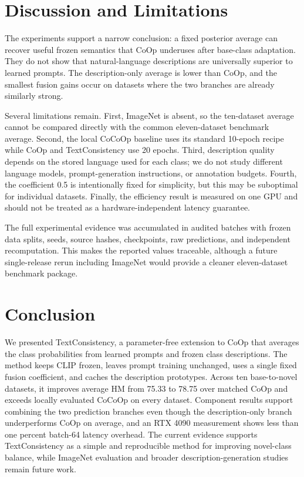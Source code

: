 \documentclass[preprint,12pt]{elsarticle}
\begin{document}
\section{Discussion and Limitations}
\label{sec:limitations}

The experiments support a narrow conclusion: a fixed posterior average can recover useful frozen semantics that CoOp underuses after base-class adaptation. They do not show that natural-language descriptions are universally superior to learned prompts. The description-only average is lower than CoOp, and the smallest fusion gains occur on datasets where the two branches are already similarly strong.

Several limitations remain. First, ImageNet is absent, so the ten-dataset average cannot be compared directly with the common eleven-dataset benchmark average. Second, the local CoCoOp baseline uses its standard 10-epoch recipe while CoOp and TextConsistency use 20 epochs. Third, description quality depends on the stored language used for each class; we do not study different language models, prompt-generation instructions, or annotation budgets. Fourth, the coefficient 0.5 is intentionally fixed for simplicity, but this may be suboptimal for individual datasets. Finally, the efficiency result is measured on one GPU and should not be treated as a hardware-independent latency guarantee.

The full experimental evidence was accumulated in audited batches with frozen data splits, seeds, source hashes, checkpoints, raw predictions, and independent recomputation. This makes the reported values traceable, although a future single-release rerun including ImageNet would provide a cleaner eleven-dataset benchmark package.

\section{Conclusion}

We presented TextConsistency, a parameter-free extension to CoOp that averages the class probabilities from learned prompts and frozen class descriptions. The method keeps CLIP frozen, leaves prompt training unchanged, uses a single fixed fusion coefficient, and caches the description prototypes. Across ten base-to-novel datasets, it improves average HM from 75.33 to 78.75 over matched CoOp and exceeds locally evaluated CoCoOp on every dataset. Component results support combining the two prediction branches even though the description-only branch underperforms CoOp on average, and an RTX 4090 measurement shows less than one percent batch-64 latency overhead. The current evidence supports TextConsistency as a simple and reproducible method for improving novel-class balance, while ImageNet evaluation and broader description-generation studies remain future work.
\end{document}
